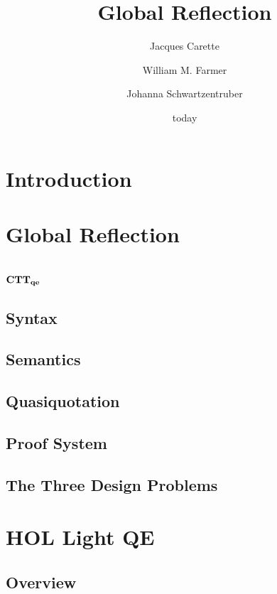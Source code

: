 \documentclass[fleqn]{article}
\title{{\bf Global Reflection}}
\author{Jacques Carette \and William M. Farmer \and Johanna Schwartzentruber}
\date{today}
\begin{document}
\maketitle

\begin{abstract}

\end{abstract}

\section{Introduction}\label{sec:introduction}

\section{Global Reflection}\label{sec:global-reflection}

\section{${\rm {\bf CTT_{qe}}}$}\label{sec:ctt_qe}

\subsection{Syntax}

\subsection{Semantics}

\subsection{Quasiquotation}

\subsection{Proof System}

\subsection{The Three Design Problems} 

\section{HOL Light QE} \label{sec:hol-light-qe}

\subsection{Overview}
\end{document}
